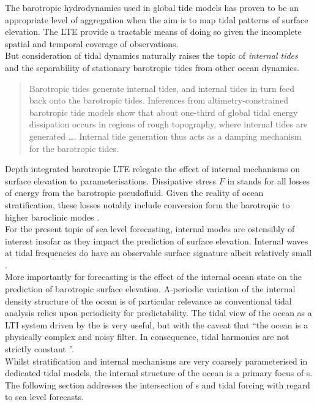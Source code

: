 
The barotropic hydrodynamics used in global tide models has proven to be an appropriate level of aggregation when the aim is to map tidal patterns of surface elevation.  The LTE provide a tractable means of doing so given the incomplete spatial and temporal coverage of observations.\\
But consideration of tidal dynamics naturally raises the topic of \emph{internal tides} and the separability of stationary barotropic tides from other ocean dynamics.\\
\begin{quotation}
Barotropic tides generate internal tides, and internal tides in turn feed back onto the barotropic tides. Inferences from altimetry-constrained barotropic tide models show that about one-third of global tidal energy dissipation occurs in regions of rough topography, where internal tides are generated \dots{}. Internal tide generation thus acts as a damping mechanism for the barotropic tides.\citep[pp22]{Arbic:hy}
\end{quotation}
Depth integrated barotropic LTE relegate the effect of internal mechanisms on surface elevation to parameterisations.  Dissipative stress $F$ in \label{E:LTE_momtm} stands for all losses of energy from the barotropic pseudofluid.  Given the reality of ocean stratification, these losses notably include conversion form the barotropic to higher baroclinic modes \cite[pp121] {gill1982atmosphere}. \\



For the present topic of sea level forecasting, internal modes are ostensibly of interest insofar as they impact the prediction of surface elevation.  Internal waves at tidal frequencies do have an observable surface signature albeit relatively small \cite{Ray:2011tj}.\\
More importantly for forecasting is the effect of the internal ocean state on the prediction of barotropic surface elevation.  A-periodic variation of the internal density structure of the ocean is of particular relevance as   conventional tidal analysis relies upon periodicity for predictability.     The tidal view of the ocean as a LTI system driven by the \ATGP{} is very useful, but with the caveat that ``the ocean is a physically complex and noisy filter.  In consequence, tidal harmonics are not strictly constant \citep[197]{Ray:2010jm}''.\\



Whilst stratification and internal mechanisms are very coarsely parameterised in dedicated tidal models, the internal structure of the ocean is a primary focus of \OGCM{}s.   The following section addresses the intersection of \OGCM{}s and tidal forcing with regard to sea level forecasts.


